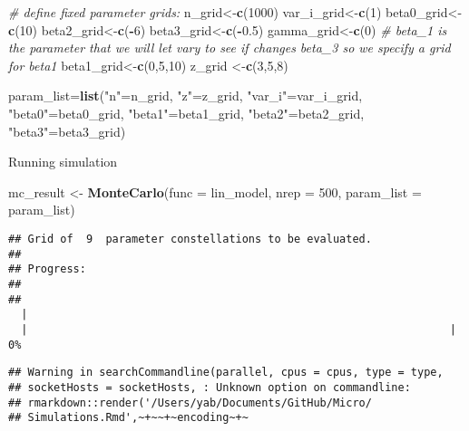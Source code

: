\documentclass[]{article}
\newenvironment{Shaded}{\begin{snugshade}}{\end{snugshade}}
\newcommand{\CommentTok}[1]{\textcolor[rgb]{0.56,0.35,0.01}{\textit{#1}}}
\newcommand{\DataTypeTok}[1]{\textcolor[rgb]{0.13,0.29,0.53}{#1}}
\newcommand{\DecValTok}[1]{\textcolor[rgb]{0.00,0.00,0.81}{#1}}
\newcommand{\FloatTok}[1]{\textcolor[rgb]{0.00,0.00,0.81}{#1}}
\newcommand{\KeywordTok}[1]{\textcolor[rgb]{0.13,0.29,0.53}{\textbf{#1}}}
\newcommand{\NormalTok}[1]{#1}
\newcommand{\OperatorTok}[1]{\textcolor[rgb]{0.81,0.36,0.00}{\textbf{#1}}}
\newcommand{\StringTok}[1]{\textcolor[rgb]{0.31,0.60,0.02}{#1}}
\begin{document}
\begin{Shaded}
\begin{Highlighting}[]
\CommentTok{# define fixed parameter grids:}
\NormalTok{  n_grid<-}\KeywordTok{c}\NormalTok{(}\DecValTok{1000}\NormalTok{)}
\NormalTok{  var_i_grid<-}\KeywordTok{c}\NormalTok{(}\DecValTok{1}\NormalTok{)}
\NormalTok{  beta0_grid<-}\KeywordTok{c}\NormalTok{(}\DecValTok{10}\NormalTok{)}
\NormalTok{  beta2_grid<-}\KeywordTok{c}\NormalTok{(}\OperatorTok{-}\DecValTok{6}\NormalTok{)}
\NormalTok{  beta3_grid<-}\KeywordTok{c}\NormalTok{(}\OperatorTok{-}\FloatTok{0.5}\NormalTok{)}
\NormalTok{  gamma_grid<-}\KeywordTok{c}\NormalTok{(}\DecValTok{0}\NormalTok{)}
\CommentTok{# beta_1 is the parameter that we will let vary to see if changes beta_3 so we specify a grid for beta1 }
\NormalTok{  beta1_grid<-}\KeywordTok{c}\NormalTok{(}\DecValTok{0}\NormalTok{,}\DecValTok{5}\NormalTok{,}\DecValTok{10}\NormalTok{)}
\NormalTok{  z_grid <-}\KeywordTok{c}\NormalTok{(}\DecValTok{3}\NormalTok{,}\DecValTok{5}\NormalTok{,}\DecValTok{8}\NormalTok{)}
  
\NormalTok{param_list=}\KeywordTok{list}\NormalTok{(}\StringTok{"n"}\NormalTok{=n_grid, }\StringTok{"z"}\NormalTok{=z_grid, }\StringTok{"var_i"}\NormalTok{=var_i_grid, }\StringTok{"beta0"}\NormalTok{=beta0_grid, }\StringTok{"beta1"}\NormalTok{=beta1_grid, }\StringTok{"beta2"}\NormalTok{=beta2_grid, }\StringTok{"beta3"}\NormalTok{=beta3_grid)}
\end{Highlighting}
\end{Shaded}

Running simulation

\begin{Shaded}
\begin{Highlighting}[]
\NormalTok{mc_result <-}\StringTok{ }\KeywordTok{MonteCarlo}\NormalTok{(}\DataTypeTok{func =}\NormalTok{ lin_model, }\DataTypeTok{nrep =} \DecValTok{500}\NormalTok{, }\DataTypeTok{param_list =}\NormalTok{ param_list)}
\end{Highlighting}
\end{Shaded}

\begin{verbatim}
## Grid of  9  parameter constellations to be evaluated. 
##  
## Progress: 
##  
## 
  |                                                                       
  |                                                                 |   0%
\end{verbatim}

\begin{verbatim}
## Warning in searchCommandline(parallel, cpus = cpus, type = type,
## socketHosts = socketHosts, : Unknown option on commandline:
## rmarkdown::render('/Users/yab/Documents/GitHub/Micro/
## Simulations.Rmd',~+~~+~encoding~+~
\end{verbatim}
\end{document}
